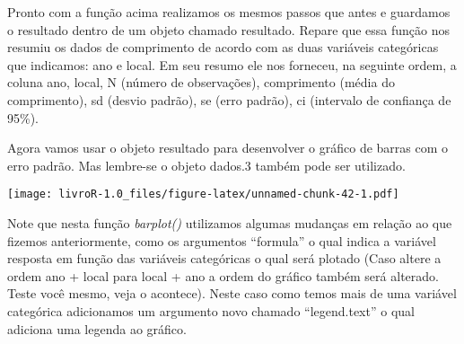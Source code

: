 \documentclass[]{book}
\newenvironment{Shaded}{\begin{snugshade}}{\end{snugshade}}
\newcommand{\DataTypeTok}[1]{\textcolor[rgb]{0.13,0.29,0.53}{#1}}
\newcommand{\DecValTok}[1]{\textcolor[rgb]{0.00,0.00,0.81}{#1}}
\newcommand{\FloatTok}[1]{\textcolor[rgb]{0.00,0.00,0.81}{#1}}
\newcommand{\KeywordTok}[1]{\textcolor[rgb]{0.13,0.29,0.53}{\textbf{#1}}}
\newcommand{\NormalTok}[1]{#1}
\newcommand{\OperatorTok}[1]{\textcolor[rgb]{0.81,0.36,0.00}{\textbf{#1}}}
\newcommand{\OtherTok}[1]{\textcolor[rgb]{0.56,0.35,0.01}{#1}}
\newcommand{\StringTok}[1]{\textcolor[rgb]{0.31,0.60,0.02}{#1}}
\begin{document}
Pronto com a função acima realizamos os mesmos passos que antes e guardamos o resultado dentro de um objeto chamado resultado. Repare que essa função nos resumiu os dados de comprimento de acordo com as duas variáveis categóricas que indicamos: ano e local. Em seu resumo ele nos forneceu, na seguinte ordem, a coluna ano, local, N (número de observações), comprimento (média do comprimento), sd (desvio padrão), se (erro padrão), ci (intervalo de confiança de 95\%).

Agora vamos usar o objeto resultado para desenvolver o gráfico de barras com o erro padrão. Mas lembre-se o objeto dados.3 também pode ser utilizado.

\begin{Shaded}
\end{Shaded}

\texttt{[image: livroR-1.0\_files/figure-latex/unnamed-chunk-42-1.pdf]}

Note que nesta função \emph{barplot()} utilizamos algumas mudanças em relação ao que fizemos anteriormente, como os argumentos ``formula'' o qual indica a variável resposta em função das variáveis categóricas o qual será plotado (Caso altere a ordem ano + local para local + ano a ordem do gráfico também será alterado. Teste você mesmo, veja o acontece). Neste caso como temos mais de uma variável categórica adicionamos um argumento novo chamado ``legend.text'' o qual adiciona uma legenda ao gráfico.
\end{document}
